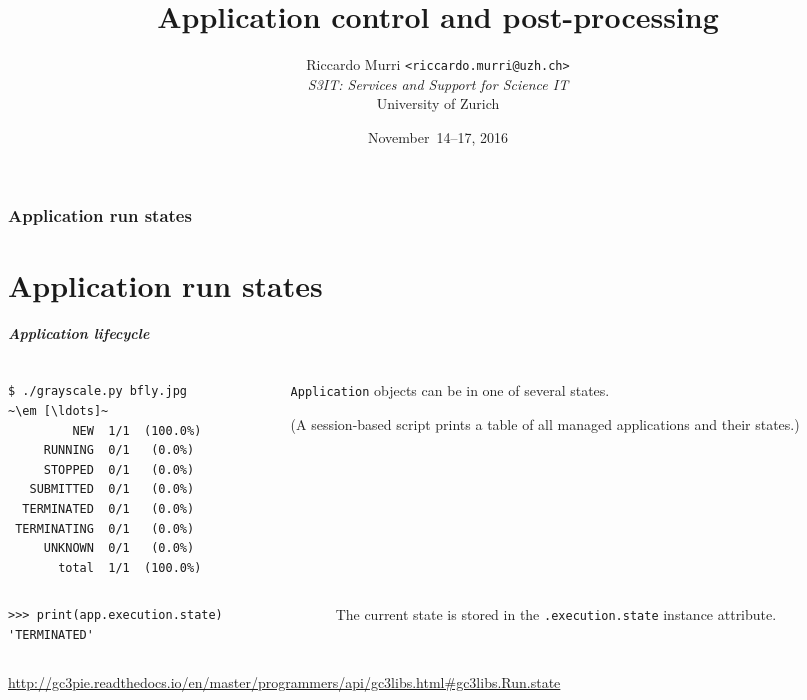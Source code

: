 \documentclass[english,serif,mathserif,xcolor=pdftex,dvipsnames,table]{beamer}
\title[Post-processing]{%
  Application control and post-processing
}
\author[R. Murri, S3IT UZH]{%
  Riccardo Murri \texttt{<riccardo.murri@uzh.ch>}
  \\[1ex]
  \emph{S3IT: Services and Support for Science IT}
  \\[1ex]
  University of Zurich
}
\date{November~14--17, 2016}
\begin{document}
\maketitle


\section{Application run states}
\part{Application run states}

\begin{frame}[fragile]
\frametitle{Application lifecycle}

\begin{columns}[c]
  \begin{column}{0.5\textwidth}
\begin{lstlisting}[basicstyle=\footnotesize\ttfamily,keywordstyle=\normalfont]
$ ./grayscale.py bfly.jpg
~\em [\ldots]~
         NEW  1/1  (100.0%)
     RUNNING  0/1   (0.0%)
     STOPPED  0/1   (0.0%)
   SUBMITTED  0/1   (0.0%)
  TERMINATED  0/1   (0.0%)
 TERMINATING  0/1   (0.0%)
     UNKNOWN  0/1   (0.0%)
       total  1/1  (100.0%)
\end{lstlisting}%
  \end{column}
  \begin{column}{0.5\textwidth}
    \raggedleft
    \texttt{Application} objects can be in one of several states.

    \+
    (A session-based script prints a table of all managed applications and their states.)
  \end{column}
\end{columns}

\+
\begin{columns}[c]
  \begin{column}{0.5\textwidth}
\begin{lstlisting}[basicstyle=\footnotesize\ttfamily]
>>> print(app.execution.state)
'TERMINATED'
\end{lstlisting}
  \end{column}
  \begin{column}{0.5\textwidth}
    \raggedleft
    The current state is stored in the \texttt{.execution.state} instance attribute.
  \end{column}
\end{columns}

\+
\begin{references}
  \tiny
  \url{http://gc3pie.readthedocs.io/en/master/programmers/api/gc3libs.html#gc3libs.Run.state}
\end{references}
\end{frame}
\end{document}
